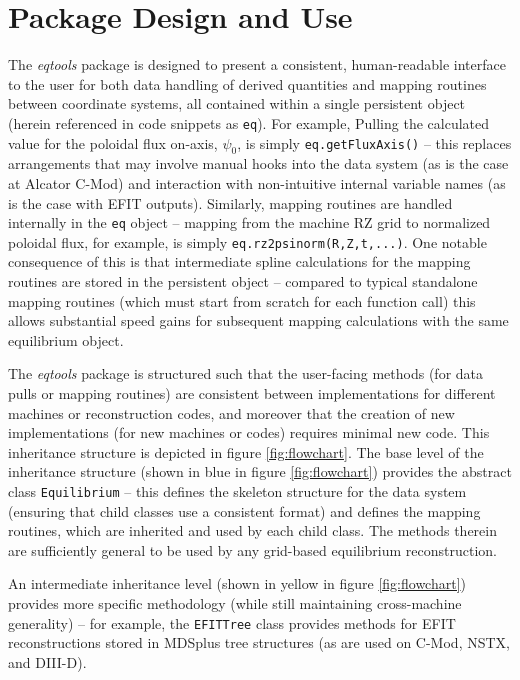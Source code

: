 \documentclass[12pt,floatfix,showpacs]{revtex4-1}
\newcommand{\gnote}[1]{\marginpar{\textcolor{red}{\scriptsize{#1}}}}
\begin{document}
\section{Package Design and Use}\label{sec:design}

The \emph{eqtools} package is designed to present a consistent, human-readable interface to the user for both data handling of derived quantities and mapping routines between coordinate systems, all contained within a single persistent object (herein referenced in code snippets as \verb|eq|).  For example, Pulling the calculated value for the poloidal flux on-axis, $\psi_0$, is simply \verb|eq.getFluxAxis()| -- this replaces arrangements that may involve manual hooks into the data system (as is the case at Alcator C-Mod) and interaction with non-intuitive internal variable names (as is the case with EFIT outputs\gnote{too harsh?}).  Similarly, mapping routines are handled internally in the \verb|eq| object -- mapping from the machine RZ grid to normalized poloidal flux, for example, is simply \verb|eq.rz2psinorm(R,Z,t,...)|.  One notable consequence of this is that intermediate spline calculations for the mapping routines are stored in the persistent object -- compared to typical standalone mapping routines (which must start from scratch for each function call) this allows substantial speed gains for subsequent mapping calculations with the same equilibrium object.

The \emph{eqtools} package is structured such that the user-facing methods (for data pulls or mapping routines) are consistent between implementations for different machines or reconstruction codes, and moreover that the creation of new implementations (for new machines or codes) requires minimal new code.  This inheritance structure is depicted in figure \ref{fig:flowchart}.  The base level of the inheritance structure (shown in blue in figure \ref{fig:flowchart}) provides the abstract class \verb|Equilibrium| -- this defines the skeleton structure for the data system (ensuring that child classes use a consistent format) and defines the mapping routines, which are inherited and used by each child class.  The methods therein are sufficiently general to be used by any grid-based equilibrium reconstruction.

An intermediate inheritance level (shown in yellow in figure \ref{fig:flowchart}) provides more specific methodology (while still maintaining cross-machine generality) -- for example, the \verb|EFITTree| class provides methods for EFIT reconstructions stored in MDSplus tree structures (as are used on C-Mod, NSTX, and DIII-D\gnote{cites?}).
\end{document}
